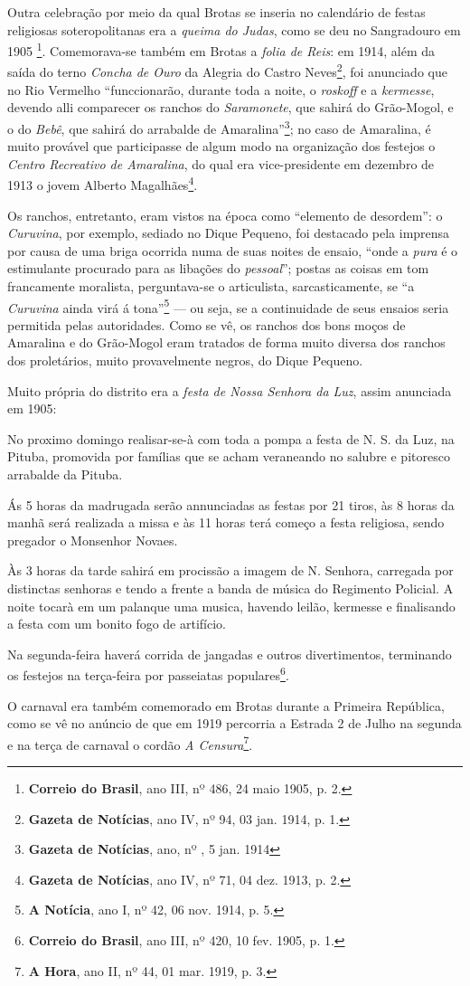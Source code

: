 Outra celebração por meio da qual Brotas se inseria no calendário de festas religiosas soteropolitanas era a \textit{queima do Judas}, como se deu no Sangradouro em 1905 \footnote{\textbf{Correio do Brasil}, ano III, nº 486, 24 maio 1905, p. 2.}. Comemorava-se também em Brotas a \textit{folia de Reis}: em 1914, além da saída do terno \textit{Concha de Ouro} da Alegria do Castro Neves\footnote{\textbf{Gazeta de Notícias}, ano IV, nº 94, 03 jan. 1914, p. 1.}, foi anunciado que no Rio Vermelho ``funccionarão, durante toda a noite, o \textit{roskoff} e a \textit{kermesse}, devendo alli comparecer os ranchos do \textit{Saramonete}, que sahirá do Grão-Mogol, e o do \textit{Bebê}, que sahirá do arrabalde de Amaralina''\footnote{\textbf{Gazeta de Notícias}, ano, nº , 5 jan. 1914}; no caso de Amaralina, é muito provável que participasse de algum modo na organização dos festejos o \textit{Centro Recreativo de Amaralina}, do qual era vice-presidente em dezembro de 1913 o jovem Alberto Magalhães\footnote{\textbf{Gazeta de Notícias}, ano IV, nº 71, 04 dez. 1913, p. 2.}.

Os ranchos, entretanto, eram vistos na época como ``elemento de desordem'': o \textit{Curuvina}, por exemplo, sediado no Dique Pequeno, foi destacado pela imprensa por causa de uma briga ocorrida numa de suas noites de ensaio, ``onde a \textit{pura} é o estimulante procurado para as libações do \textit{pessoal}''; postas as coisas em tom francamente moralista, perguntava-se o articulista, sarcasticamente, se ``a \textit{Curuvina} ainda virá á tona''\footnote{\textbf{A Notícia}, ano I, nº 42, 06 nov. 1914, p. 5.} --- ou seja, se a continuidade de seus ensaios seria permitida pelas autoridades. Como se vê, os ranchos dos bons moços de Amaralina e do Grão-Mogol eram tratados de forma muito diversa dos ranchos dos proletários, muito provavelmente negros, do Dique Pequeno.

Muito própria do distrito era a \textit{festa de Nossa Senhora da Luz}, assim anunciada em 1905:

\begin{citacao}
No proximo domingo realisar-se-à com toda a pompa a festa de N. S. da Luz, na Pituba, promovida por famílias que se acham veraneando no salubre e pitoresco arrabalde da Pituba.

Ás 5 horas da madrugada serão annunciadas as festas por 21 tiros, às 8 horas da manhã será realizada a missa e às 11 horas terá começo a festa religiosa, sendo pregador o Monsenhor Novaes.

Às 3 horas da tarde sahirá em procissão a imagem de N. Senhora, carregada por distinctas senhoras e tendo a frente a banda de música do Regimento Policial. A noite tocarà em um palanque uma musica, havendo leilão, kermesse e finalisando a festa com um bonito fogo de artifício.

Na segunda-feira haverá corrida de jangadas e outros divertimentos, terminando os festejos na terça-feira por passeiatas populares\footnote{\textbf{Correio do Brasil}, ano III, nº 420, 10 fev. 1905, p. 1.}.
\end{citacao}

O carnaval era também comemorado em Brotas durante a Primeira República, como se vê no anúncio de que em 1919 percorria a Estrada 2 de Julho na segunda e na terça de carnaval o cordão \textit{A Censura}\footnote{\textbf{A Hora}, ano II, nº 44, 01 mar. 1919, p. 3.}.